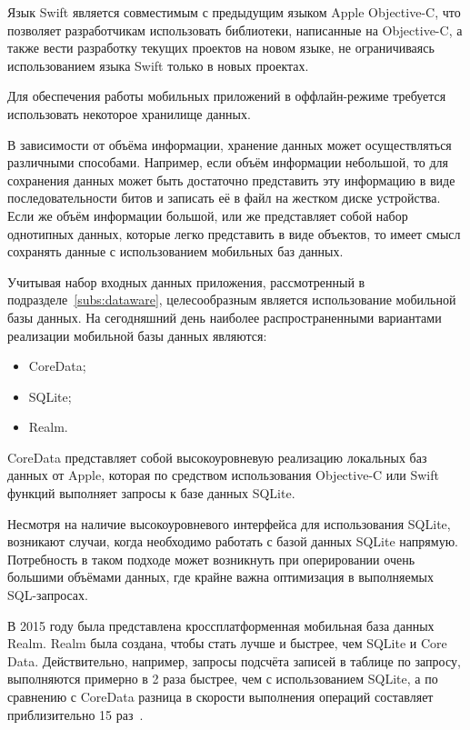 Язык Swift является совместимым с предыдущим языком Apple Objective-C,
что позволяет разработчикам использовать библиотеки, написанные на Objective-C,
а также вести разработку текущих проектов на новом языке, не ограничиваясь
использованием языка Swift только в новых проектах.

Для обеспечения работы мобильных приложений в оффлайн-режиме требуется
использовать некоторое хранилище данных.

В зависимости от объёма информации, хранение данных может осуществляться
различными способами. Например, если объём информации небольшой, то для
сохранения данных может быть достаточно представить эту информацию
в виде последовательности битов и записать её в файл на жестком диске устройства.
Если же объём информации большой, или же представляет собой набор однотипных данных,
которые легко представить в виде объектов, то имеет смысл сохранять данные
с использованием мобильных баз данных.

Учитывая набор входных данных приложения, рассмотренный в подразделе~\ref{subs:dataware},
целесообразным является использование мобильной базы данных. На сегодняшний день
наиболее распространенными вариантами реализации мобильной базы данных являются:
\begin{itemize}
  \item CoreData;
  \item SQLite;
  \item Realm.
\end{itemize}

CoreData представляет собой высокоуровневую реализацию локальных баз данных от Apple,
которая по средством использования Objective-C или Swift функций
выполняет запросы к базе данных SQLite.

Несмотря на наличие высокоуровневого интерфейса для использования SQLite,
возникают случаи, когда необходимо работать с базой данных SQLite напрямую.
Потребность в таком подходе может возникнуть при оперировании очень большими
объёмами данных, где крайне важна оптимизация в выполняемых SQL-запросах.

В 2015 году была представлена кроссплатформенная мобильная база данных Realm.
Realm была создана, чтобы стать лучше и быстрее, чем SQLite и Core Data.
Действительно, например, запросы подсчёта записей в таблице по запросу,
выполняются примерно в 2 раза быстрее, чем с использованием SQLite,
а по сравнению с CoreData разница в скорости выполнения операций составляет
приблизительно 15 раз~\cite{core_data_diff, core_data_vs_sqlite}.

